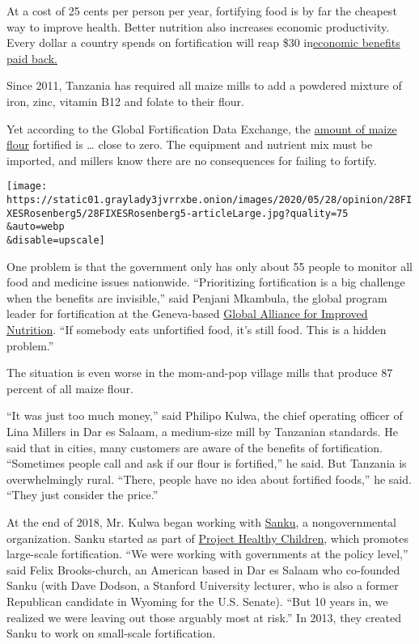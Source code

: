 At a cost of 25 cents per person per year, fortifying food is by far the
cheapest way to improve health. Better nutrition also increases economic
productivity. Every dollar a country spends on fortification will reap
\$30
in\href{https://www.copenhagenconsensus.com/publication/third-copenhagen-consensus-hunger-and-malnutrition-assessment-hoddinott-rosegrant-torero}{economic
benefits paid back.}

Since 2011, Tanzania has required all maize mills to add a powdered
mixture of iron, zinc, vitamin B12 and folate to their flour.

Yet according to the Global Fortification Data Exchange, the
\href{https://fortificationdata.org/country-fortification-dashboard/?alpha3_code=TZA\&lang=en}{amount
of maize flour} fortified is \ldots{} close to zero. The equipment and
nutrient mix must be imported, and millers know there are no
consequences for failing to fortify.

\texttt{[image: https://static01.graylady3jvrrxbe.onion/images/2020/05/28/opinion/28FIXESRosenberg5/28FIXESRosenberg5-articleLarge.jpg?quality=75\\\&auto=webp\\\&disable=upscale]}

One problem is that the government only has only about 55 people to
monitor all food and medicine issues nationwide. ``Prioritizing
fortification is a big challenge when the benefits are invisible,'' said
Penjani Mkambula, the global program leader for fortification at the
Geneva-based \href{http://www.gainhealth.org/}{Global Alliance for
Improved Nutrition}. ``If somebody eats unfortified food, it's still
food. This is a hidden problem.''

The situation is even worse in the mom-and-pop village mills that
produce 87 percent of all maize flour.

``It was just too much money,'' said Philipo Kulwa, the chief operating
officer of Lina Millers in Dar es Salaam, a medium-size mill by
Tanzanian standards. He said that in cities, many customers are aware of
the benefits of fortification. ``Sometimes people call and ask if our
flour is fortified,'' he said. But Tanzania is overwhelmingly rural.
``There, people have no idea about fortified foods,'' he said. ``They
just consider the price.''

At the end of 2018, Mr. Kulwa began working with
\href{http://projecthealthychildren.com/small-scale-fortification/}{Sanku},
a nongovernmental organization. Sanku started as part of
\href{http://www.projecthealthychildren.org/}{Project Healthy Children},
which promotes large-scale fortification. ``We were working with
governments at the policy level,'' said Felix Brooks-church, an American
based in Dar es Salaam who co-founded Sanku (with Dave Dodson, a
Stanford University lecturer, who is also a former Republican candidate
in Wyoming for the U.S. Senate). ``But 10 years in, we realized we were
leaving out those arguably most at risk.'' In 2013, they created Sanku
to work on small-scale fortification.

